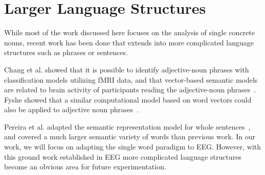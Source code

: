 \section{Larger Language Structures}

While most of the work discussed here focuses on the analysis of single 
concrete nouns, recent work has been done that extends into more complicated 
language structures such as phrases or sentences. 

Chang et al. showed that it is possible to identify adjective-noun phrases with 
classification models utilizing fMRI data, and that vector-based semantic 
models are related to brain activity of participants reading the adjective-noun 
phrases~\cite{Chang2009}. Fyshe showed that a similar computational model based 
on word vectors could also be applied to adjective noun 
phrases~\cite{afyshethesis}.

Pereira et al. adapted the semantic representation model for whole 
sentences~\cite{pereira2018toward}, and covered a much larger semantic variety 
of words than previous work. In our work, we will focus on adapting the single 
word paradigm to EEG. However, with this ground work established in EEG more 
complicated language structures become an obvious area for future 
experimentation.
